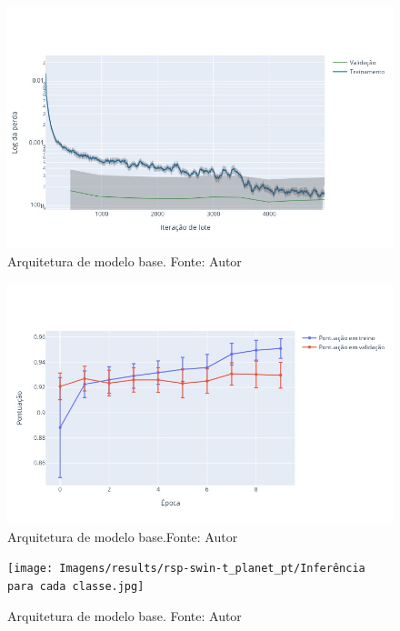 
\begin{figure}[!ht]
    \centering
    \includegraphics[width=\columnwidth]{Imagens/results/rsp-swin-t_planet_pt/Training Loss Per Minibatch.jpg}
    \caption{ Arquitetura de modelo base. Fonte: Autor}
    \label{fig:LossTrainSwin}
\end{figure}

\begin{figure}[!ht]
    \centering
    \includegraphics[width=\columnwidth]{Imagens/results/rsp-swin-t_planet_pt/pontuação em treino e validação por época.jpg}
    \caption{ Arquitetura de modelo base.Fonte: Autor}
    \label{fig:PontuacaoTrainSwin}
\end{figure}  
\begin{figure}[!ht]
    \centering
    \texttt{[image: Imagens/results/rsp-swin-t\_planet\_pt/Inferência para cada classe.jpg]}
    \caption{ Arquitetura de modelo base.
    Fonte: Autor}
    \label{fig:InferenciaClassesSwin}
\end{figure}  



